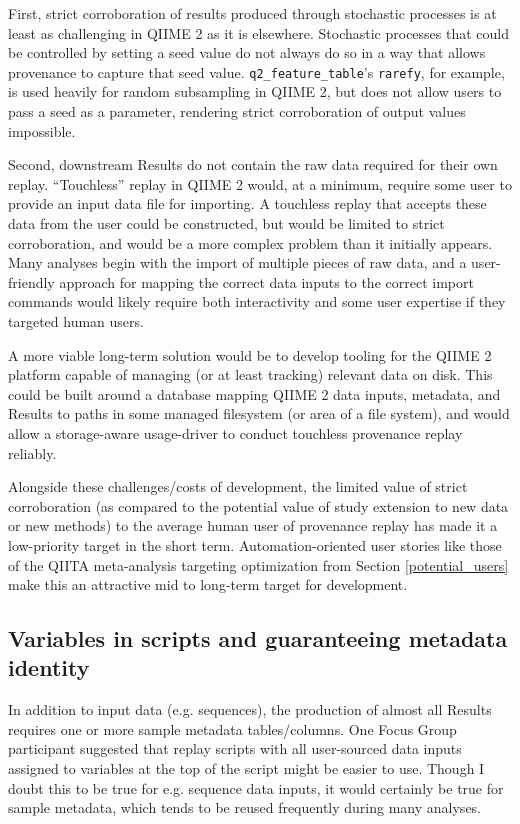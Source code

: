 First, strict corroboration of results produced through stochastic processes is
at least as challenging in QIIME 2 as it is elsewhere. Stochastic processes that
could be controlled by setting a seed value do not always do so in a way that
allows provenance to capture that seed value. \texttt{q2\_feature\_table}’s \texttt{rarefy},
for example, is used heavily for random subsampling in QIIME 2, but does not allow
users to pass a seed as a parameter, rendering strict corroboration of output
values impossible.

Second, downstream Results do not contain the raw data required for their own
replay. “Touchless” replay in QIIME 2 would, at a minimum, require some user to
provide an input data file for importing. A touchless replay that accepts these
data from the user could be constructed, but would be limited to strict
corroboration, and would be a more complex problem than it initially appears.
Many analyses begin with the import of multiple pieces of raw data, and a
user-friendly approach for mapping the correct data inputs to the correct import
commands would likely require both interactivity and some user expertise if they
targeted human users.

A more viable long-term solution would be to develop tooling for the QIIME 2
platform capable of managing (or at least tracking) relevant data on disk. This
could be built around a database mapping QIIME 2 data inputs, metadata, and
Results to paths in some managed filesystem (or area of a file system), and
would allow a storage-aware usage-driver to conduct touchless provenance replay
reliably.

Alongside these challenges/costs of development, the limited value of strict
corroboration (as compared to the potential value of study extension to new data
or new methods) to the average human user of provenance replay has made it a
low-priority target in the short term. Automation-oriented user stories like
those of the QIITA meta-analysis targeting optimization from Section \ref{potential_users}
make this an attractive mid to long-term target for development.

\subsection{Variables in scripts and guaranteeing metadata identity \parencite[Issue 44]{keefe_issues_2021}}

In addition to input data (e.g. sequences), the production of almost all Results
requires one or more sample metadata tables/columns. One Focus Group participant
suggested that replay scripts with all user-sourced data inputs assigned to
variables at the top of the script might be easier to use. Though I doubt this
to be true for e.g. sequence data inputs, it would certainly be true for sample
metadata, which tends to be reused frequently during many analyses.

